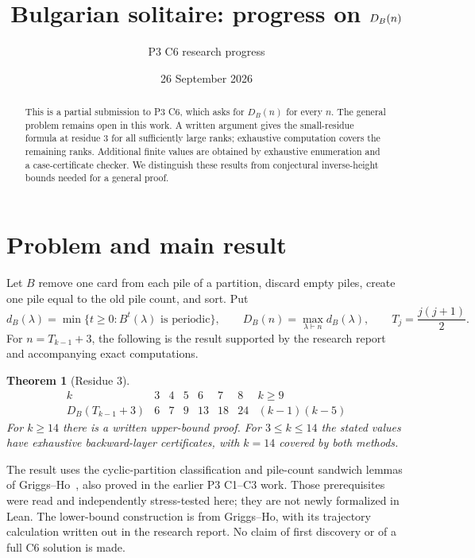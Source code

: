 \documentclass[11pt]{article}
\title{Bulgarian solitaire: progress on $\DB(n)$}
\author{P3 C6 research progress}
\date{26 September 2026}
\newtheorem{theorem}{Theorem}
\newcommand{\DB}{D_B}
\newcommand{\Tr}{T}
\begin{document}
\maketitle

\begin{abstract}
This is a partial submission to P3 C6, which asks for $\DB(n)$ for every $n$.
The general problem remains open in this work.  A written argument gives the
small-residue formula at residue $3$ for all sufficiently large ranks; exhaustive
computation covers the remaining ranks.  Additional finite values are obtained
by exhaustive enumeration and a case-certificate checker.  We distinguish
these results from conjectural inverse-height bounds needed for a general proof.
\end{abstract}

\section{Problem and main result}
Let $B$ remove one card from each pile of a partition, discard empty piles,
create one pile equal to the old pile count, and sort.  Put
\[
 d_B(\lambda)=\min\{t\geq0:B^t(\lambda)\text{ is periodic}\},\qquad
 \DB(n)=\max_{\lambda\vdash n}d_B(\lambda),\qquad
 \Tr_j=\frac{j(j+1)}2.
\]
For $n=\Tr_{k-1}+3$, the following is the result supported by the research
report and accompanying exact computations.

\begin{theorem}[Residue $3$]
\[
\begin{array}{c|rrrrrr|c}
k&3&4&5&6&7&8&k\geq9\\ \hline
\DB(\Tr_{k-1}+3)&6&7&9&13&18&24&(k-1)(k-5)
\end{array}
\]
For $k\geq14$ there is a written upper-bound proof.  For $3\leq k\leq14$
the stated values have exhaustive backward-layer certificates, with $k=14$
covered by both methods.
\end{theorem}

The result uses the cyclic-partition classification and pile-count sandwich
lemmas of Griggs--Ho~\cite{GH}, also proved in the earlier P3 C1--C3 work.
Those prerequisites were read and independently stress-tested here; they are
not newly formalized in Lean.  The lower-bound construction is from
Griggs--Ho, with its trajectory calculation written out in the research
report.  No claim of first discovery or of a full C6 solution is made.
\end{document}
